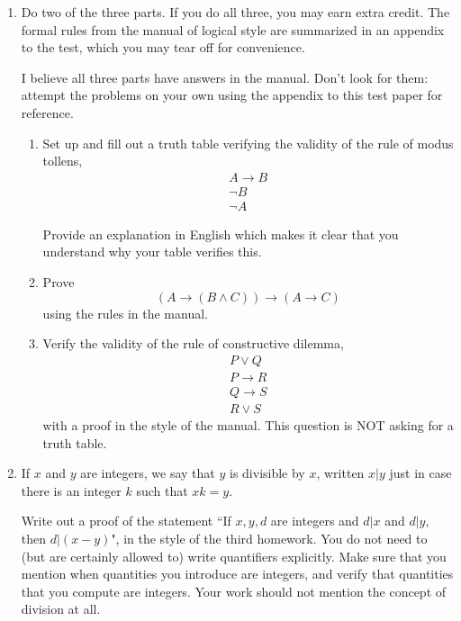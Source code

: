 \documentclass[12pt]{article}
\begin{document}
\begin{enumerate}


\item Do two of the three parts.  If you do all three, you may earn extra credit.  The formal rules from the manual of logical style are summarized in an appendix to the test, which you may tear off for convenience.

I believe all three parts have answers in the manual.  Don't look for them:  attempt the problems on your own using the appendix to this test paper for reference.

\begin{enumerate}

\item  Set up and fill out a truth table verifying the validity of the rule of modus tollens, $$\begin{array}{c} A \rightarrow B \\ \neg B \\ \hline \neg A\end{array}$$

Provide an explanation in English which makes it clear that you understand why your table verifies this.


\newpage  

\item Prove $$(A \rightarrow (B \wedge C)) \rightarrow (A \rightarrow C)$$ using the rules in the manual.

\newpage  

\item Verify the validity of the rule of constructive dilemma,  $$\begin{array}{c} P \vee Q \\ P \rightarrow R \\ Q \rightarrow S \\ \hline R \vee S \end{array}$$ with a proof in the style of the manual.
This question is NOT asking for a truth table.

\end{enumerate}

\newpage

\item  If $x$ and $y$ are integers, we say that $y$ is divisible by $x$, written $x|y$ just in case there is an integer $k$ such that $xk=y$.

Write out a proof of the statement ``If $x,y,d$ are integers and $d|x$ and $d|y$, then $d|(x-y)$", in the style of the third homework.  You do not need to (but are certainly allowed to)
write quantifiers explicitly.  Make sure that you mention when quantities you introduce are integers, and verify that quantities that you compute are integers.  Your work should not mention the concept of division at all.


\end{enumerate}
\end{document}
